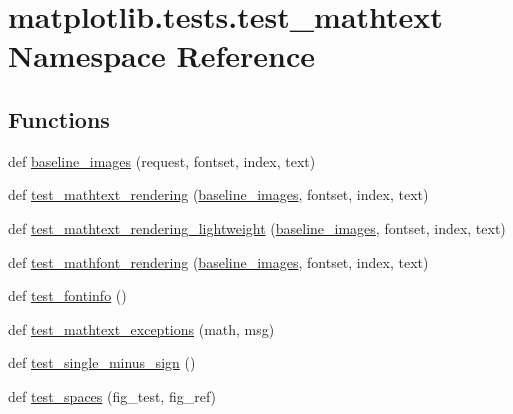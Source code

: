 \hypertarget{namespacematplotlib_1_1tests_1_1test__mathtext}{}\section{matplotlib.\+tests.\+test\+\_\+mathtext Namespace Reference}
\label{namespacematplotlib_1_1tests_1_1test__mathtext}
\subsection*{Functions}
\begin{DoxyCompactItemize}
\item 
def \hyperlink{namespacematplotlib_1_1tests_1_1test__mathtext_aad4552044525169a91daf86d51ce1b15}{baseline\+\_\+images} (request, fontset, index, text)
\item 
def \hyperlink{namespacematplotlib_1_1tests_1_1test__mathtext_a182492308eb8d5e59e6d4e6ab09e43e2}{test\+\_\+mathtext\+\_\+rendering} (\hyperlink{namespacematplotlib_1_1tests_1_1test__mathtext_aad4552044525169a91daf86d51ce1b15}{baseline\+\_\+images}, fontset, index, text)
\item 
def \hyperlink{namespacematplotlib_1_1tests_1_1test__mathtext_a3adc964999110049487a59de59775bb8}{test\+\_\+mathtext\+\_\+rendering\+\_\+lightweight} (\hyperlink{namespacematplotlib_1_1tests_1_1test__mathtext_aad4552044525169a91daf86d51ce1b15}{baseline\+\_\+images}, fontset, index, text)
\item 
def \hyperlink{namespacematplotlib_1_1tests_1_1test__mathtext_a299876649e4adf363897d9f9599f4c6e}{test\+\_\+mathfont\+\_\+rendering} (\hyperlink{namespacematplotlib_1_1tests_1_1test__mathtext_aad4552044525169a91daf86d51ce1b15}{baseline\+\_\+images}, fontset, index, text)
\item 
def \hyperlink{namespacematplotlib_1_1tests_1_1test__mathtext_a98b3b9a1a255dac9b9e9dc05908565a9}{test\+\_\+fontinfo} ()
\item 
def \hyperlink{namespacematplotlib_1_1tests_1_1test__mathtext_ada469c9cb141b4b16ba19e9827b7755b}{test\+\_\+mathtext\+\_\+exceptions} (math, msg)
\item 
def \hyperlink{namespacematplotlib_1_1tests_1_1test__mathtext_ab150dfb72c41f8abf38cb4535f64fc26}{test\+\_\+single\+\_\+minus\+\_\+sign} ()
\item 
def \hyperlink{namespacematplotlib_1_1tests_1_1test__mathtext_aaf4c91a704f842604dad0805fc2850d0}{test\+\_\+spaces} (fig\+\_\+test, fig\+\_\+ref)
\item 

\end{DoxyCompactItemize}

